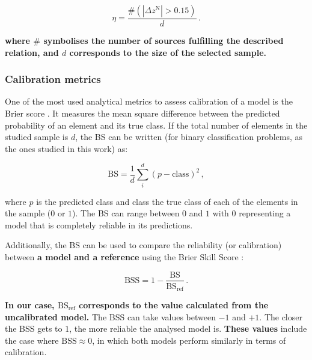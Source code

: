 \documentclass{aa}
\begin{document}
\begin{equation}\label{eq:outlier_fraction}
\eta = \frac{\# \left( \left|\Delta z^{\mathrm{N}}\right| > 0.15 \right)}{d}\,.
\end{equation}

\noindent\textbf{where $\#$ symbolises the number of sources fulfilling the described relation, and $d$ corresponds to the size of the selected sample.}


\subsubsection{Calibration metrics}\label{sec:metrics_calibration}

One of the most used analytical metrics to assess calibration of a model is the Brier score \citep[BS;][]{Brier_1950}. It measures the mean square difference between the predicted probability of an element and its true class. If the total number of elements in the studied sample is $d$, the BS can be written (for binary classification problems, as the ones studied in this work) as:

\begin{equation}\label{eq:brier_score}
\mathrm{BS} = \frac{1}{d} \sum_{i}^{d}(p - \mathrm{class})^{2}\,,
\end{equation}

\noindent where $p$ is the predicted class and \textrm{class} the true class of each of the elements in the sample ($0$ or $1$).
The BS can range between $0$ and $1$ with $0$ representing a model that is completely reliable in its predictions.

Additionally, the BS can be used to compare the reliability (or calibration) between \textbf{a model and a reference} using the Brier Skill Score \citep[BSS; e.g.][]{Glahn_1970}:

\begin{equation}\label{eq:brier_skill_score}
\mathrm{BSS} = 1 - \frac{\mathrm{BS}}{\mathrm{BS}_{\mathrm{ref}}}\,.
\end{equation}

\textbf{In our case, $\mathrm{BS}_{\mathrm{ref}}$ corresponds to the value calculated from the uncalibrated model.} The BSS can take values between $-1$ and $+1$. The closer the BSS gets to $1$, the more reliable the analysed model is. \textbf{These values} include the case where ${\mathrm{BSS} {\approx} 0}$, in which both models perform similarly in terms of calibration.
\end{document}
